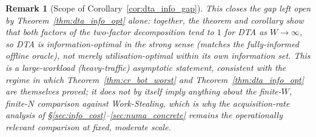 \documentclass[11pt,a4paper]{report}
\newtheorem{remark}{Remark}[section]
\begin{document}
\begin{remark}[Scope of Corollary~\ref{cor:dta_info_gap}]
This closes the gap left open by Theorem~\ref{thm:dta_info_opt} alone:
together, the theorem and corollary show that \emph{both} factors of the
two-factor decomposition tend to $1$ for DTA as $W \to \infty$, so DTA is
information-optimal in the strong sense (matches the fully-informed
offline oracle), not merely utilisation-optimal within its own
information set. This is a large-workload (heavy-traffic) asymptotic
statement, consistent with the regime in which
Theorem~\ref{thm:cr_bot_worst} and Theorem~\ref{thm:dta_info_opt} are
themselves proved; it does not by itself imply anything about the
finite-$W$, finite-$N$ comparison against Work-Stealing, which is why
the acquisition-rate analysis of \S\ref{sec:info_cost}--\ref{sec:numa_concrete}
remains the operationally relevant comparison at fixed, moderate scale.
\end{remark}
\end{document}
